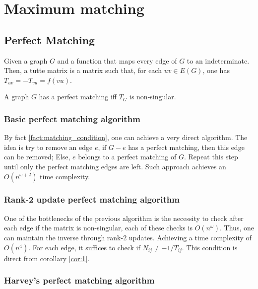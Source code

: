 \chapter{Maximum matching}

\section{Perfect Matching}

\begin{definition}[Indeterminates]

\end{definition}


\begin{definition}
    Given a graph \(G\) and a function that maps every edge of \(G\) to an indeterminate.
    Then, a tutte matrix is a matrix such that, for each \(uv \in E(G)\), one has \(T_{uv} = -T_{vu} = f(vu)\).
\end{definition}

\begin{fact}
    \label{fact:matching_condition}
    A graph \(G\) has a perfect matching iff \(T_G\) is non-singular.
\end{fact}

\subsection{Basic perfect matching algorithm}

By fact \ref{fact:matching_condition}, one can achieve a very direct algorithm.
The idea is try to remove an edge \(e\), if \(G - e\) has a perfect matching, 
then this edge can be removed; Else, \(e\) belongs to a perfect matching of \(G\).
Repeat this step until only the perfect matching edges are left.
Such approach achieves an \(O(n^{\omega + 2})\) time complexity.

\subsection{Rank-2 update perfect matching algorithm}

One of the bottlenecks of the previous algorithm is the necessity to check after each
edge if the matrix is non-singular, each of these checks is \(O(n^{\omega})\).
Thus, one can maintain the inverse through rank-2 updates.
Achieving a time complexity of \(O(n^{4})\).
For each edge, it suffices to check if \(N_{ij} \neq -1/T_{ij}\).
This condition is direct from corollary \ref{cor:1}.

\subsection{Harvey's perfect matching algorithm}